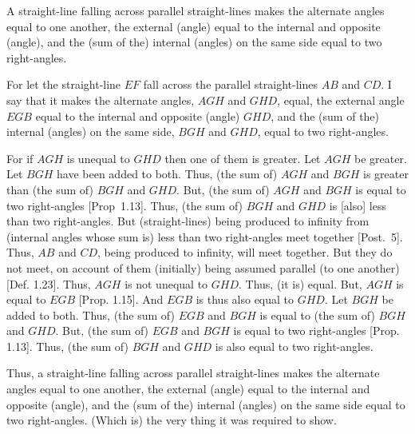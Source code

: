 \begin{Parallel}{}{}
{A straight-line falling across  parallel straight-lines makes the alternate angles
equal to one another,  the external (angle) equal to the internal and
opposite (angle), and the (sum of the) internal (angles) on the same side equal to
two right-angles.

\epsfysize=2.2in
\centerline{}

For let the straight-line $EF$ fall across the parallel straight-lines $AB$ and $CD$.
I say that it makes the  alternate angles, $AGH$ and $GHD$,  equal,  the
external angle $EGB$ equal to the internal and opposite (angle) $GHD$,
and the (sum of the) internal (angles) on the same side, $BGH$ and $GHD$, equal to
two right-angles.

For if $AGH$ is unequal to $GHD$ then one of them is greater. Let $AGH$ be greater.
Let $BGH$ have been added to both. Thus, (the sum of) $AGH$ and $BGH$ is greater
than (the sum of) $BGH$ and $GHD$. But, (the sum of) $AGH$ and $BGH$ is equal to two right-angles
[Prop~1.13]. Thus,  (the sum of) $BGH$ and $GHD$ is [also] less than two right-angles. 
But (straight-lines) being produced to infinity from (internal angles whose sum is) less than
two right-angles meet together [Post.~5]. Thus, $AB$ and $CD$, being produced to
infinity, will meet together. But they do not meet, on account of
them (initially) being assumed parallel (to one another) [Def. 1.23]. Thus, $AGH$ is not unequal to $GHD$. Thus, (it is) equal. But, $AGH$ is equal to $EGB$ [Prop. 1.15]. 
And $EGB$ is thus also equal to $GHD$.
Let $BGH$
be added to both. Thus, (the sum of) $EGB$ and $BGH$ is equal to (the sum of) $BGH$ and $GHD$.
But, (the sum of) $EGB$ and $BGH$ is equal to two right-angles [Prop. 1.13]. 
Thus, (the sum of) $BGH$ and $GHD$ is also equal to two right-angles.

Thus, a straight-line falling across parallel straight-lines makes the alternate angles
equal to one another,  the external (angle) equal to the internal and
opposite (angle), and the (sum of the) internal (angles) on the same side equal to
two right-angles. (Which is) the very thing it was required to show.}
\end{Parallel}

